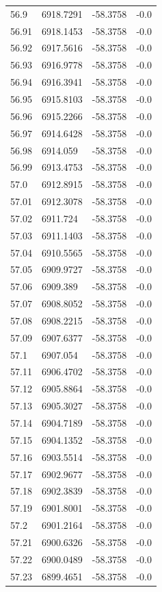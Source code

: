 \begin{table}[H]
\begin{tabular}{llll}
56.9 & 6918.7291 & -58.3758 & -0.0 \\
56.91 & 6918.1453 & -58.3758 & -0.0 \\
56.92 & 6917.5616 & -58.3758 & -0.0 \\
56.93 & 6916.9778 & -58.3758 & -0.0 \\
56.94 & 6916.3941 & -58.3758 & -0.0 \\
56.95 & 6915.8103 & -58.3758 & -0.0 \\
56.96 & 6915.2266 & -58.3758 & -0.0 \\
56.97 & 6914.6428 & -58.3758 & -0.0 \\
56.98 & 6914.059 & -58.3758 & -0.0 \\
56.99 & 6913.4753 & -58.3758 & -0.0 \\
57.0 & 6912.8915 & -58.3758 & -0.0 \\
57.01 & 6912.3078 & -58.3758 & -0.0 \\
57.02 & 6911.724 & -58.3758 & -0.0 \\
57.03 & 6911.1403 & -58.3758 & -0.0 \\
57.04 & 6910.5565 & -58.3758 & -0.0 \\
57.05 & 6909.9727 & -58.3758 & -0.0 \\
57.06 & 6909.389 & -58.3758 & -0.0 \\
57.07 & 6908.8052 & -58.3758 & -0.0 \\
57.08 & 6908.2215 & -58.3758 & -0.0 \\
57.09 & 6907.6377 & -58.3758 & -0.0 \\
57.1 & 6907.054 & -58.3758 & -0.0 \\
57.11 & 6906.4702 & -58.3758 & -0.0 \\
57.12 & 6905.8864 & -58.3758 & -0.0 \\
57.13 & 6905.3027 & -58.3758 & -0.0 \\
57.14 & 6904.7189 & -58.3758 & -0.0 \\
57.15 & 6904.1352 & -58.3758 & -0.0 \\
57.16 & 6903.5514 & -58.3758 & -0.0 \\
57.17 & 6902.9677 & -58.3758 & -0.0 \\
57.18 & 6902.3839 & -58.3758 & -0.0 \\
57.19 & 6901.8001 & -58.3758 & -0.0 \\
57.2 & 6901.2164 & -58.3758 & -0.0 \\
57.21 & 6900.6326 & -58.3758 & -0.0 \\
57.22 & 6900.0489 & -58.3758 & -0.0 \\
57.23 & 6899.4651 & -58.3758 & -0.0 \\

\end{tabular}
\end{table}
